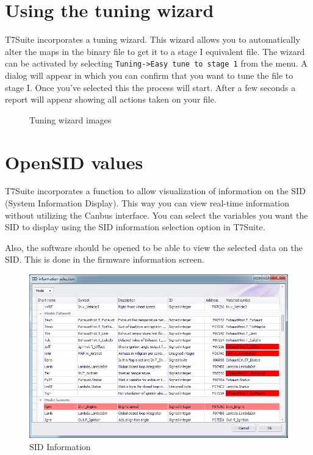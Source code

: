 \documentclass[11pt,a4paper]{book}
\newcommand{\Mfig}[1]{%
\begin{figure}
    \centering
    \missingfigure{#1}
    \caption{#1}
\end{figure}}
\begin{document}
\chapter{Using the tuning wizard}

T7Suite incorporates a tuning wizard. This wizard allows you to automatically
alter the maps in the binary file to get it to a stage I equivalent file. The
wizard can be activated by selecting \texttt{Tuning->Easy tune to stage 1} from the
menu. A dialog will appear in which you can confirm that you want to tune the
file to stage I. Once you’ve selected this the process will start. After a few
seconds a report will appear showing all actions taken on your file.

\Mfig{Tuning wizard images}

\chapter{OpenSID values}
T7Suite incorporates a function to allow visualization of information on the SID
(System Information Display). This way you can view real-time information
without utilizing the Canbus interface. You can select the variables you want
the SID to display using the SID information selection option in T7Suite.

Also, the software should be opened to be able to view the selected data on the
SID. This is done in the firmware information screen.
\begin{figure}
    \centering
    \includegraphics[width=.9\linewidth]{sid.png}
    \caption{SID Information}
    \label{fig:}
\end{figure}
\end{document}
